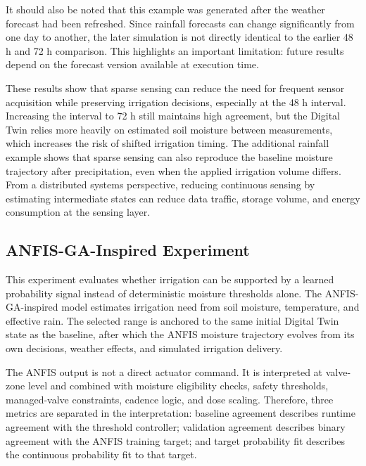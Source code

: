 \par It should also be noted that this example was generated after the weather forecast
    had been refreshed. Since rainfall forecasts can change significantly from one day to
    another, the later simulation is not directly identical to the earlier 48 h and 72 h
    comparison. This highlights an important limitation: future results depend on the
    forecast version available at execution time.

\par These results show that sparse sensing can reduce the need for frequent sensor
    acquisition while preserving irrigation decisions, especially at the 48 h interval.
    Increasing the interval to 72 h still maintains high agreement, but the Digital Twin
    relies more heavily on estimated soil moisture between measurements, which increases
    the risk of shifted irrigation timing. The additional rainfall example shows that
    sparse sensing can also reproduce the baseline moisture trajectory after
    precipitation, even when the applied irrigation volume differs. From a distributed
    systems perspective, reducing continuous sensing by estimating intermediate states can
    reduce data traffic, storage volume, and energy consumption at the sensing layer.

\subsection{ANFIS-GA-Inspired Experiment}
\label{subsec:anfis_results}

\par This experiment evaluates whether irrigation can be supported by a learned
    probability signal instead of deterministic moisture thresholds alone. The
    ANFIS-GA-inspired model estimates irrigation need from soil moisture, temperature,
    and effective rain. The selected range is anchored to the same initial Digital Twin
    state as the baseline, after which the ANFIS moisture trajectory evolves from its own
    decisions, weather effects, and simulated irrigation delivery.

\par The ANFIS output is not a direct actuator command. It is interpreted at valve-zone
    level and combined with moisture eligibility checks, safety thresholds, managed-valve
    constraints, cadence logic, and dose scaling. Therefore, three metrics are separated
    in the interpretation: baseline agreement describes runtime agreement with the
    threshold controller; validation agreement describes binary agreement with the ANFIS
    training target; and target probability fit describes the continuous probability fit
    to that target.

